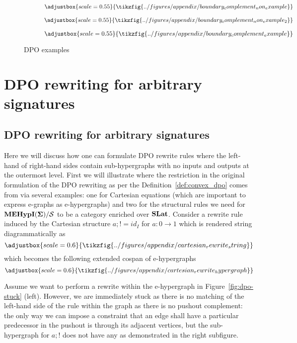 \begin{figure*}
    \begin{subfigure}{0.48\textwidth}
\[
\adjustbox{scale=0.55}{
    \tikzfig{../figures/appendix/boundary_complement_non_example}
}
\]
    \end{subfigure}
\hfill
    \begin{subfigure}{0.48\textwidth}
        \[
        \adjustbox{scale=0.55}{
            \tikzfig{../figures/appendix/boundary_complement_non_example_2}
        }
        \]
            \end{subfigure}
\begin{subfigure}{\textwidth}
    \[
    \adjustbox{scale=0.55}{
        \tikzfig{../figures/appendix/boundary_complement_example}
    }
    \]
        \end{subfigure}
\caption{DPO examples}
\label{fig:not_boundary_complement}
\end{figure*}


\ifdefined\ONECOLUMN
\section{DPO rewriting for arbitrary signatures}
\else
\subsection{DPO rewriting for arbitrary signatures}
\fi
\label{sec:dpo-fix}
Here we will discuss how one can formulate DPO rewrite rules where the left-hand of right-hand sides contain sub-hypergraphs with no inputs and outputs at the outermost level.
First we will illustrate where the restriction in the original formulation of the DPO rewriting as per the Definition~\ref{def:convex_dpo} comes from via several examples: one for Cartesian equations (which are important to express e-graphs as e-hypergraphs) and two for the structural rules we need for ${\mathbf{MEHypI(\Sigma)}} / \mathcal{S}$ to be a category enriched over $\mathbf{SLat}$.
Consider a rewrite rule induced by the Cartesian structure $a;! = id_{I}$ for $a : 0 \to 1$ which is rendered string diagrammatically as 
\[
\adjustbox{scale=0.6}{
\tikzfig{../figures/appendix/cartesian_rewrite_string}
}
\]
which becomes the following extended cospan of e-hypergraphs
\[
\adjustbox{scale=0.6}{
\tikzfig{../figures/appendix/cartesian_rewrite_hypergraph}
}
\]

Assume we want to perform a rewrite within the e-hypergraph in Figure~\ref{fig:dpo-stuck} (left).
However, we are immediately stuck as there is no matching of the left-hand side of the rule within the graph as there is no pushout complement: the only way we can impose a constraint that an edge shall have a particular predecessor in the pushout is through its adjacent vertices, but the sub-hypergraph for $a;!$ does not have any as demonstrated in the right subfigure.


